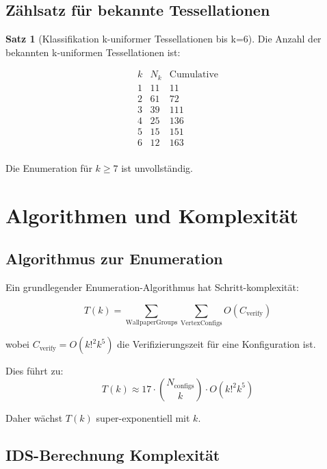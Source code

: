 \documentclass[a4paper,12pt]{article}
\theoremstyle{definition}
\newtheorem{satz}{Satz}[section]
\begin{document}
\subsection{Zählsatz für bekannte Tessellationen}

\begin{satz}[Klassifikation k-uniformer Tessellationen bis k=6]
	Die Anzahl der bekannten k-uniformen Tessellationen ist:
	
	\begin{equation}
	\begin{array}{c|c|c}
		k & N_k & \text{Cumulative} \\
		\hline
		1 & 11 & 11 \\
		2 & 61 & 72 \\
		3 & 39 & 111 \\
		4 & 25 & 136 \\
		5 & 15 & 151 \\
		6 & 12 & 163 \\
	\end{array}
	\end{equation}
	
	Die Enumeration für $k \geq 7$ ist unvollständig.
\end{satz}

\section{Algorithmen und Komplexität}

\subsection{Algorithmus zur Enumeration}

Ein grundlegender Enumeration-Algorithmus hat Schritt-komplexität:

\begin{equation}
T(k) = \sum_{\text{WallpaperGroups}} \sum_{\text{VertexConfigs}} O(C_{\text{verify}})
\end{equation}

wobei $C_{\text{verify}} = O(k!^2 k^5)$ die Verifizierungszeit für eine Konfiguration ist.

Dies führt zu:
\[
T(k) \approx 17 \cdot \binom{N_{\text{configs}}}{k} \cdot O(k!^2 k^5)
\]

Daher wächst $T(k)$ super-exponentiell mit $k$.

\subsection{IDS-Berechnung Komplexität}
\end{document}
